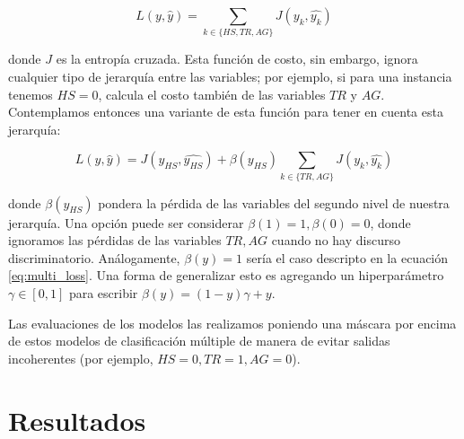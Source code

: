 \begin{equation}
\label{eq:multi_loss}
L(y, \widehat{y}) = \sum\limits_{k \in \{HS, TR, AG\}} J(y_k, \widehat{y_k})
\end{equation}

donde $J$ es la entropía cruzada. Esta función de costo, sin embargo, ignora cualquier tipo de jerarquía entre las variables; por ejemplo, si para una instancia tenemos $HS = 0$, calcula el costo también de las variables $TR$ y $AG$. Contemplamos entonces una variante de esta función para tener en cuenta esta jerarquía:

\begin{equation}
    \label{eq:hierarchical_loss}
    L(y, \widehat{y}) =  J(y_{HS}, \widehat{y_{HS}}) + \beta(y_{HS})\sum\limits_{k \in \{TR, AG\}} J(y_k, \widehat{y_k})
\end{equation}

donde $\beta(y_{HS})$ pondera la pérdida de las variables del segundo nivel de nuestra jerarquía. Una opción puede ser considerar $\beta(1) = 1, \beta(0) = 0$, donde ignoramos las pérdidas de las variables $TR, AG$ cuando no hay discurso discriminatorio. Análogamente, $\beta(y) = 1$ sería el caso descripto en la ecuación \ref{eq:multi_loss}. Una forma de generalizar esto es agregando un hiperparámetro $\gamma \in [0, 1]$ para escribir $\beta(y) = (1-y) \gamma + y$.

Las evaluaciones de los modelos las realizamos poniendo una máscara por encima de estos modelos de clasificación múltiple de manera de evitar salidas incoherentes (por ejemplo, $HS = 0, TR = 1, AG= 0$).


\section{Resultados}

\newcommand{\esrow}[1]{\multirow{#1}{*}{es}}
\newcommand{\enrow}[1]{\multirow{#1}{*}{en}}

